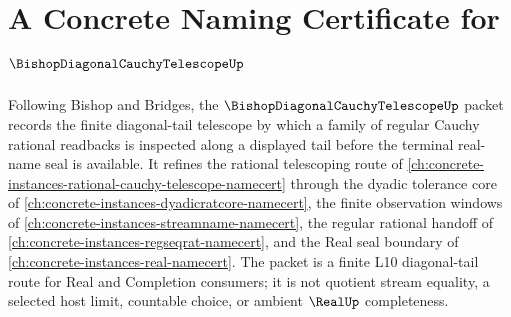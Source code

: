 \chapter{A Concrete Naming Certificate for $\BishopDiagonalCauchyTelescopeUp$}
\label{ch:concrete-instances-bishop-diagonal-cauchy-telescope-namecert}

Following Bishop and Bridges, the $\BishopDiagonalCauchyTelescopeUp$ packet records the finite diagonal-tail telescope by which a family of regular Cauchy rational readbacks is inspected along a displayed tail before the terminal real-name seal is available. It refines the rational telescoping route of \autoref{ch:concrete-instances-rational-cauchy-telescope-namecert} through the dyadic tolerance core of \autoref{ch:concrete-instances-dyadicratcore-namecert}, the finite observation windows of \autoref{ch:concrete-instances-streamname-namecert}, the regular rational handoff of \autoref{ch:concrete-instances-regseqrat-namecert}, and the Real seal boundary of \autoref{ch:concrete-instances-real-namecert}. The packet is a finite L10 diagonal-tail route for Real and Completion consumers; it is not quotient stream equality, a selected host limit, countable choice, or ambient $\RealUp$ completeness.

